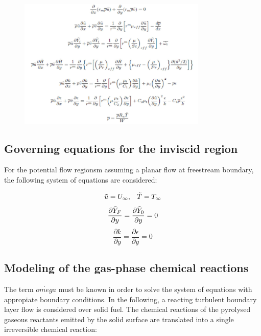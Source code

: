 \documentclass[12pt]{article}
\begin{document}
\begin{figure}[h!]
\centering
\includegraphics[width=0.8\textwidth]{figures/turbulent.png}
\end{figure}

\subsection{Governing equations for the inviscid region}

For the potential flow regionsm assuming a planar flow at freestream boundary, the following system of equations are considered:

\begin{equation}
    \Tilde{u} = U_{\infty}, \;\;\; \Tilde{T}=T_{\infty}
\end{equation}
\begin{equation}
    \frac{\partial \Tilde{Y}_{F}}{\partial y} =  \frac{\partial \Tilde{Y}_{0}}{\partial y} = 0
\end{equation}
\begin{equation}
    \frac{\partial k}{\partial y} = \frac{\partial \epsilon}{\partial y} = 0
\end{equation}

\subsection{Modeling of the gas-phase chemical reactions}

The term $\dot{omega}$ must be known in order to solve the system of equations with appropiate boundary conditions. In the following, a reacting turbulent boundary layer flow is considered over solid fuel. The chemical reactions of the pyrolysed gaseous reactants emitted by the solid surface are translated into a single irreversible chemical reaction:
\end{document}

